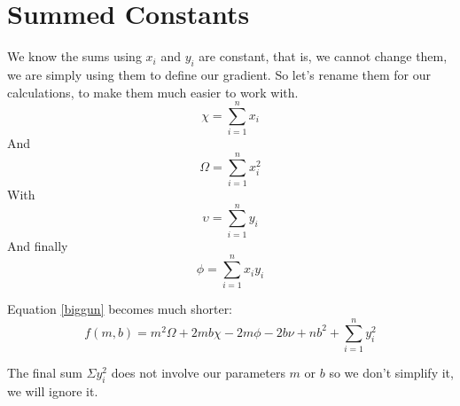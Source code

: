 \documentclass{article}
\begin{document}
\section{Summed Constants}

We know the sums using $x_i$ and $y_i$ are constant, that is, we cannot change them, we are simply using them to define our gradient.
So let's rename them for our calculations, to make them much easier to work with.
\begin{equation}
\chi = \sum_{i=1}^n x_i
\end{equation}
And
\begin{equation}
\Omega = \sum_{i=1}^n x_i^2
\end{equation}
With
\begin{equation}
\upsilon = \sum_{i=1}^n y_i
\end{equation}
And finally
\begin{equation}
\phi = \sum_{i=1}^n x_i y_i
\end{equation}

Equation \eqref{biggun} becomes much shorter:
\begin{equation}
\label{shorty}
f(m, b) = m^2 \Omega + 2 m b \chi - 2 m \phi - 2 b \nu + n b^2 + \sum_{i=1}^n y_i^2 
\end{equation}

The final sum $\Sigma y_i^2$ does not involve our parameters $m$ or $b$ so we don't simplify it, we will ignore it.
\end{document}
